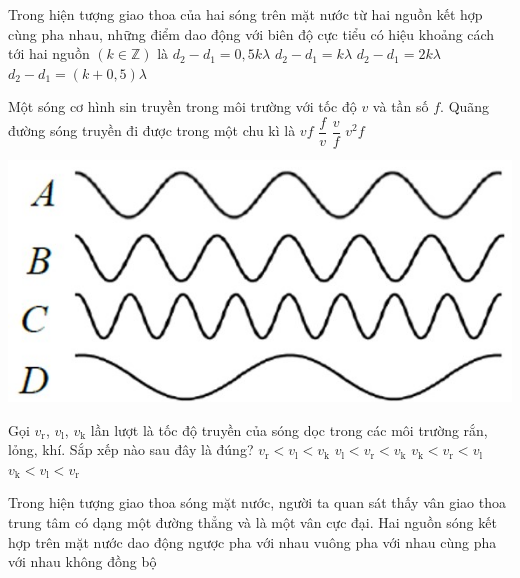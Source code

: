 \begin{ex}
Trong hiện tượng giao thoa của hai sóng trên mặt nước từ hai nguồn kết hợp cùng pha nhau, những điểm dao động với biên độ cực tiểu có hiệu khoảng cách tới hai nguồn $\left(k\in\mathbb{Z}\right)$ là
	\choice
	{$d_2-d_1=0,5k\lambda$}
	{$d_2-d_1=k\lambda$}
	{$d_2-d_1=2k\lambda$}
	{\True $d_2-d_1=\left(k+0,5\right)\lambda$}
	\loigiai{}
\end{ex}
\begin{ex}
Một sóng cơ hình sin truyền trong môi trường với tốc độ $v$  và tần số $f$. Quãng đường sóng truyền đi được trong một chu kì là
	\choice
	{$vf$}
	{$\dfrac{f}{v}$}
	{\True $\dfrac{v}{f}$}
	{$v^2f$}
	\loigiai{}
\end{ex}
\begin{ex}
	{\vspace{-0.5cm}\includegraphics[scale=0.4]{../figs/G11-FINAL-SEM1-001-1}}
	\loigiai{}
\end{ex}
\begin{ex}
Gọi $v_{\mathrm{r}}$, $v_{\mathrm{l}}$, $v_{\mathrm{k}}$  lần lượt là tốc độ truyền của sóng dọc trong các môi trường rắn, lỏng, khí. Sắp xếp nào sau đây là đúng?
	\choice
	{$v_{\mathrm{r}}<v_{\mathrm{l}}<v_{\mathrm{k}}$}
	{$v_{\mathrm{l}}<v_{\mathrm{r}}<v_{\mathrm{k}}$}
	{$v_{\mathrm{k}}<v_{\mathrm{r}}<v_{\mathrm{l}}$}
	{\True $v_{\mathrm{k}}<v_{\mathrm{l}}<v_{\mathrm{r}}$}
	\loigiai{}
\end{ex}
\begin{ex}
Trong hiện tượng giao thoa sóng mặt nước, người ta quan sát thấy vân giao thoa trung tâm có dạng một đường thẳng và là một vân cực đại. Hai nguồn sóng kết hợp trên mặt nước dao động 
	\choice
	{ngược pha với nhau}
	{vuông pha với nhau}
	{\True cùng pha với nhau}
	{không đồng bộ}
	\loigiai{}
\end{ex}
